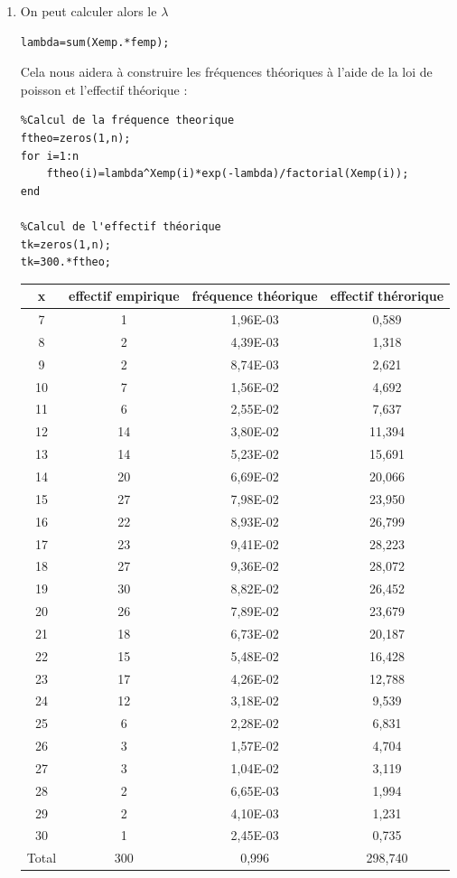 \documentclass[a4paper,oneside]{article}
\begin{document}
\begin{enumerate}

\item
On peut calculer alors le $\lambda$


\begin{lstlisting}
lambda=sum(Xemp.*femp);
\end{lstlisting}

Cela nous aidera à construire les fréquences théoriques à l'aide de la loi de poisson et l'effectif théorique :

\begin{lstlisting}
%Calcul de la fréquence theorique
ftheo=zeros(1,n);
for i=1:n
    ftheo(i)=lambda^Xemp(i)*exp(-lambda)/factorial(Xemp(i));
end

%Calcul de l'effectif théorique
tk=zeros(1,n);
tk=300.*ftheo;
\end{lstlisting}


\begin{center}
\begin{tabular}{|c|c|c|c|}

 \hline
 x	& effectif empirique & fréquence théorique & effectif thérorique\\
 \hline
 7 & 1	& 1,96E-03 & 0,589\\
 8 &	2	& 4,39E-03 & 1,318\\
 9 & 2	& 8,74E-03	&2,621\\
 10	&7	&1,56E-02	&4,692\\
 11	&6&	2,55E-02&	7,637\\
 12	&14	&3,80E-02&	11,394\\
 13	&14&	5,23E-02	&15,691\\
 14	&20	&6,69E-02	&20,066\\
 15	&27&	7,98E-02&23,950\\
 16	&22	&8,93E-02	&26,799\\
 17	&23&	9,41E-02	&28,223\\
 18	&27	&9,36E-02	&28,072\\
 19	&30&	8,82E-02	&26,452\\
 20	&26&	7,89E-02	&23,679\\
 21	&18&	6,73E-02	&20,187\\
 22	&15&	5,48E-02	&16,428\\
 23	&17&	4,26E-02	&12,788\\
 24	&12&	3,18E-02	&9,539\\
 25	&6	&2,28E-02	&6,831\\
 26	&3	&1,57E-02	&4,704\\
 27	&3	&1,04E-02	&3,119\\
 28	&2	&6,65E-03	&1,994\\
 29	&2 &4,10E-03	&1,231\\
 30	&1	&2,45E-03	&0,735\\
 \hline
 Total	&300	&0,996	&298,740\\


\end{tabular}
\end{center}
\end{enumerate}
\end{document}
